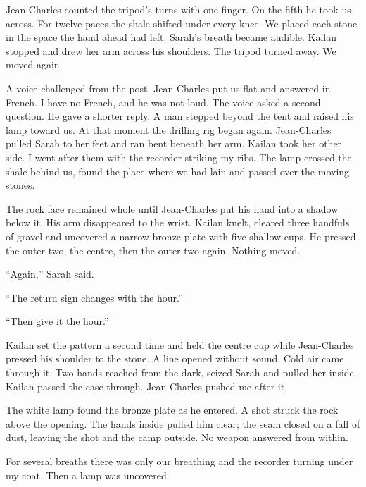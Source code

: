 Jean-Charles counted the tripod's turns with one finger. On the fifth he took us across. For twelve paces the shale shifted under every knee. We placed each stone in the space the hand ahead had left. Sarah's breath became audible. Kailan stopped and drew her arm across his shoulders. The tripod turned away. We moved again.\par

A voice challenged from the post. Jean-Charles put us flat and answered in French. I have no French, and he was not loud. The voice asked a second question. He gave a shorter reply. A man stepped beyond the tent and raised his lamp toward us. At that moment the drilling rig began again. Jean-Charles pulled Sarah to her feet and ran bent beneath her arm. Kailan took her other side. I went after them with the recorder striking my ribs. The lamp crossed the shale behind us, found the place where we had lain and passed over the moving stones.\par

The rock face remained whole until Jean-Charles put his hand into a shadow below it. His arm disappeared to the wrist. Kailan knelt, cleared three handfuls of gravel and uncovered a narrow bronze plate with five shallow cups. He pressed the outer two, the centre, then the outer two again. Nothing moved.\par

``Again,'' Sarah said.\par

``The return sign changes with the hour.''\par

``Then give it the hour.''\par

Kailan set the pattern a second time and held the centre cup while Jean-Charles pressed his shoulder to the stone. A line opened without sound. Cold air came through it. Two hands reached from the dark, seized Sarah and pulled her inside. Kailan passed the case through. Jean-Charles pushed me after it.\par

The white lamp found the bronze plate as he entered. A shot struck the rock above the opening. The hands inside pulled him clear; the seam closed on a fall of dust, leaving the shot and the camp outside. No weapon answered from within.\par

For several breaths there was only our breathing and the recorder turning under my coat. Then a lamp was uncovered.\par

